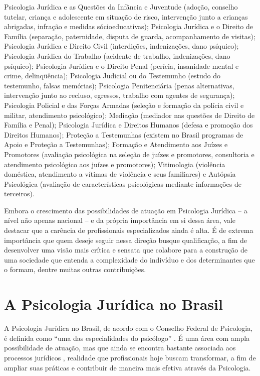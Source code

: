 \begin{citacao}
	Psicologia Jurídica e as Questões da Infância e Juventude (adoção, conselho tutelar, criança e adolescente em situação de risco, intervenção junto a crianças abrigadas, infração e medidas sócioeducativas); Psicologia Jurídica e o Direito de Família (separação, paternidade, disputa de guarda, acompanhamento de visitas); Psicologia Jurídica e Direito Civil (interdições, indenizações, dano psíquico); Psicologia Jurídica do Trabalho (acidente de trabalho, indenizações, dano psíquico); Psicologia Jurídica e o Direito Penal (perícia, insanidade mental e crime, delinqüência); Psicologia Judicial ou do Testemunho (estudo do testemunho, falsas memórias); Psicologia Penitenciária (penas alternativas, intervenção junto ao recluso, egressos, trabalho com agentes de segurança); Psicologia Policial e das Forças Armadas (seleção e formação da polícia civil e militar, atendimento psicológico); Mediação (mediador nas questões de Direito de Família e Penal); Psicologia Jurídica e Direitos Humanos (defesa e promoção dos Direitos Humanos); Proteção a Testemunhas (existem no Brasil programas de Apoio e Proteção a Testemunhas); Formação e Atendimento aos Juízes e Promotores (avaliação psicológica na seleção de juízes e promotores, consultoria e atendimento psicológico aos juízes e promotores); Vitimologia (violência doméstica, atendimento a vítimas de violência e seus familiares) e Autópsia Psicológica (avaliação de características psicológicas mediante informações de terceiros).
\end{citacao}

Embora o crescimento das possibilidades de atuação em Psicologia Jurídica -- a nível não apenas nacional -- e da própria importância em si dessa área, vale destacar que a carência de profissionais especializados ainda é alta. É de extrema importância que quem deseje seguir nessa direção busque qualificação, a fim de desenvolver uma visão mais crítica e sensata que colabore para a construção de uma sociedade que entenda a complexidade do indivíduo e dos determinantes que o formam, dentre muitas outras contribuições.

\section{A Psicologia Jurídica no Brasil}

A Psicologia Jurídica no Brasil, de acordo com o Conselho Federal de Psicologia, é definida como ``uma das especialidades do psicólogo'' \cite[p. 234]{COSTA2009}. É uma área com ampla possibilidade de atuação, mas que ainda se encontra bastante associada aos processos jurídicos , realidade que profissionais hoje buscam transformar, a fim de ampliar suas práticas e contribuir de maneira mais efetiva através da Psicologia.

